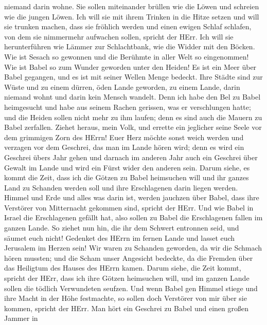 niemand darin wohne.  Sie sollen miteinander brüllen wie
die Löwen und schreien wie die jungen Löwen.  Ich will sie
mit ihrem Trinken in die Hitze setzen und will sie trunken machen, dass
sie fröhlich werden und einen ewigen Schlaf schlafen, von dem sie
nimmermehr aufwachen sollen, spricht der HErr.  Ich will
sie herunterführen wie Lämmer zur Schlachtbank, wie die Widder mit den
Böcken.  Wie ist Sesach so gewonnen und die Berühmte in
aller Welt so eingenommen! Wie ist Babel so zum Wunder geworden unter
den Heiden!  Es ist ein Meer über Babel gegangen, und es
ist mit seiner Wellen Menge bedeckt.  Ihre Städte sind zur
Wüste und zu einem dürren, öden Lande geworden, zu einem Lande, darin
niemand wohnt und darin kein Mensch wandelt.  Denn ich habe
den Bel zu Babel heimgesucht und habe aus seinem Rachen gerissen, was er
verschlungen hatte; und die Heiden sollen nicht mehr zu ihm laufen; denn
es sind auch die Mauern zu Babel zerfallen.  Ziehet heraus,
mein Volk, und errette ein jeglicher seine Seele vor dem grimmigen Zorn
des HErrn!  Euer Herz möchte sonst weich werden und
verzagen vor dem Geschrei, das man im Lande hören wird; denn es wird ein
Geschrei übers Jahr gehen und darnach im anderen Jahr auch ein Geschrei
über Gewalt im Lande und wird ein Fürst wider den anderen sein.
 Darum siehe, es kommt die Zeit, dass ich die Götzen zu
Babel heimsuchen will und ihr ganzes Land zu Schanden werden soll und
ihre Erschlagenen darin liegen werden.  Himmel und Erde und
alles was darin ist, werden jauchzen über Babel, dass ihre Verstörer von
Mitternacht gekommen sind, spricht der HErr.  Und wie Babel
in Israel die Erschlagenen gefällt hat, also sollen zu Babel die
Erschlagenen fallen im ganzen Lande.  So ziehet nun hin,
die ihr dem Schwert entronnen seid, und säumet euch nicht! Gedenket des
HErrn im fernen Lande und lasset euch Jerusalem im Herzen sein!
 Wir waren zu Schanden geworden, da wir die Schmach hören
mussten; und die Scham unser Angesicht bedeckte, da die Fremden über das
Heiligtum des Hauses des HErrn kamen.  Darum siehe, die
Zeit kommt, spricht der HErr, dass ich ihre Götzen heimsuchen will, und
im ganzen Lande sollen die tödlich Verwundeten seufzen. 
Und wenn Babel gen Himmel stiege und ihre Macht in der Höhe festmachte,
so sollen doch Verstörer von mir über sie kommen, spricht der HErr.
 Man hört ein Geschrei zu Babel und einen großen Jammer in
